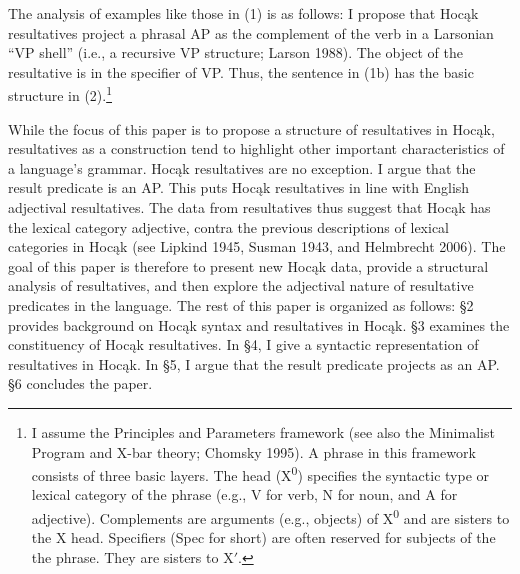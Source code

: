 \documentclass[output=paper]{LSP/langsci}
\begin{document}
The analysis of examples like those in (1) is as follows: I propose that Hoc\k{a}k resultatives project a phrasal AP as the complement of the verb in a Larsonian ``VP shell'' (i.e., a recursive VP structure; Larson 1988). The object of the resultative is in the specifier of VP. Thus, the sentence in (1b) has the basic structure in (2).\footnote{I assume the Principles and Parameters framework (see also the Minimalist Program and X-bar theory; Chomsky 1995). A phrase in this framework consists of three basic layers. The head (X\textsuperscript{0}) specifies the syntactic type or lexical category of the phrase (e.g., V for verb, N for noun, and A for adjective). Complements are arguments (e.g., objects) of X\textsuperscript{0} and are sisters to the X head. Specifiers (Spec for short) are often reserved for subjects of the the phrase. They are sisters to X$'$.}
\begin{exe}
\ex

{\hspace{1em}}\newline
{}
\end{exe}

While the focus of this paper is to propose a structure of resultatives in Hoc\k{a}k, resultatives as a construction tend to highlight other important characteristics of a language's grammar. Hoc\k{a}k resultatives are no exception. I argue that the result predicate is an AP. This puts Hoc\k{a}k resultatives in line with English adjectival resultatives. The data from resultatives
thus suggest that Hoc\k{a}k has the lexical category adjective, contra the previous descriptions of lexical categories in Hoc\k{a}k (see Lipkind 1945, Susman 1943, and Helmbrecht 2006). The goal of this paper is therefore to present new Hoc\k{a}k data, provide a structural analysis of resultatives, and then explore the adjectival nature of resultative predicates in the language. The rest of this paper is organized as follows: \S 2 provides background on Hoc\k{a}k syntax and resultatives in Hoc\k{a}k. \S 3 examines the constituency of Hoc\k{a}k resultatives. In \S 4, I give a syntactic representation of resultatives in Hoc\k{a}k. In \S 5, I argue that the result predicate projects as an AP. \S 6 concludes the paper.
\end{document}
